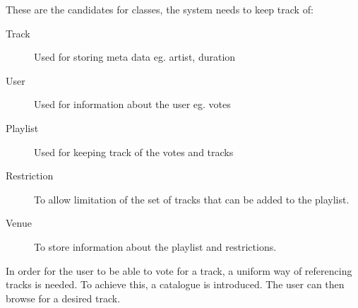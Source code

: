 These are the candidates for classes, the system needs to keep track of:
\begin{description}
    \item[Track]

    Used for storing meta data eg. artist, duration
    \item[User]

    Used for information about the user eg. votes
    \item[Playlist]

    Used for keeping track of the votes and tracks
    \item[Restriction]

    To allow limitation of the set of tracks that can be added to the playlist.
    \item[Venue]

    To store information about the playlist and restrictions.
\end{description}

In order for the user to be able to vote for a track, a uniform way of referencing tracks is needed. To achieve this, a catalogue is introduced. The user can then browse for a desired track.
